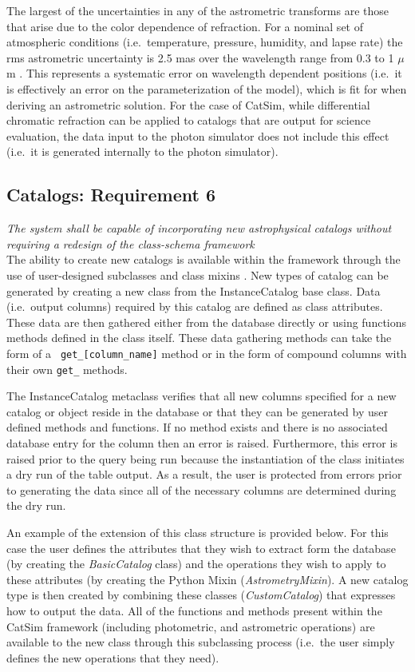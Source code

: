 \documentclass[11pt]{article}
\begin{document}
The largest of the uncertainties in any of the astrometric transforms
are those that arise due to the color dependence of refraction. For a
nominal set of atmospheric conditions (i.e.\ temperature, pressure,
humidity, and lapse rate) the rms astrometric uncertainty is 2.5 mas
over the wavelength range from 0.3 to 1 $\mu$m . This represents a
systematic error on wavelength dependent positions (i.e.\ it is
effectively an error on the parameterization of the model), which is
fit for when deriving an astrometric solution. For the case of CatSim,
while differential chromatic refraction can be applied to catalogs
that are output for science evaluation, the data input to the photon
simulator does not include this effect (i.e.\ it is generated
internally to the photon simulator).

\subsection{Catalogs: Requirement 6}

{\it The system shall be capable of incorporating new astrophysical catalogs without requiring
a redesign of the class-schema framework}\\

The ability to create new catalogs is available within the framework
through the use of user-designed subclasses and class mixins
\citep{mixin}.  New types of catalog can be generated by creating a
new class from the InstanceCatalog base class. Data (i.e.\ output
columns) required by this catalog are defined as class
attributes. These data are then gathered either from the database
directly or using functions methods defined in the class itself. These
data gathering methods can take the form of a {\tt
  get\_[column\_name]} method or in the form of compound columns with
their own {\tt get\_} methods.

The InstanceCatalog metaclass verifies that all new columns specified
for a new catalog or object reside in the database or that they can be
generated by user defined methods and functions.  If no method exists
and there is no associated database entry for the column then an error
is raised. Furthermore, this error is raised prior to the query being
run because the instantiation of the class initiates a dry run of the
table output. As a result, the user is protected from errors prior to
generating the data since all of the necessary columns are determined
during the dry run.

An example of the extension of this class structure is provided
below. For this case the user defines the attributes that they wish to
extract form the database (by creating the {\it BasicCatalog} class)
and the operations they wish to apply to these attributes (by creating
the Python Mixin ({\it AstrometryMixin}). A new catalog type is then
created by combining these classes ({\it CustomCatalog}) that
expresses how to output the data. All of the functions and methods
present within the CatSim framework (including photometric, and
astrometric operations) are available to the new class through this
subclassing process (i.e.\ the user simply defines the new operations
that they need).
\end{document}
